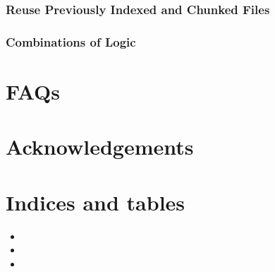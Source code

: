 \documentclass[letterpaper,10pt,english]{sphinxmanual}
\begin{document}
\subsection{Reuse Previously Indexed and Chunked Files}
\label{\detokenize{exampleWorkFlows:reuse-previously-indexed-and-chunked-files}}

\subsection{Combinations of Logic}
\label{\detokenize{exampleWorkFlows:combinations-of-logic}}

\chapter{FAQs}
\label{\detokenize{index:faqs}}

\chapter{Acknowledgements}
\label{\detokenize{index:acknowledgements}}

\chapter{Indices and tables}
\label{\detokenize{index:indices-and-tables}}\begin{itemize}
\item {} 

\item {} 

\item {} 

\end{itemize}



\renewcommand{\indexname}{Index}
\printindex
\end{document}

